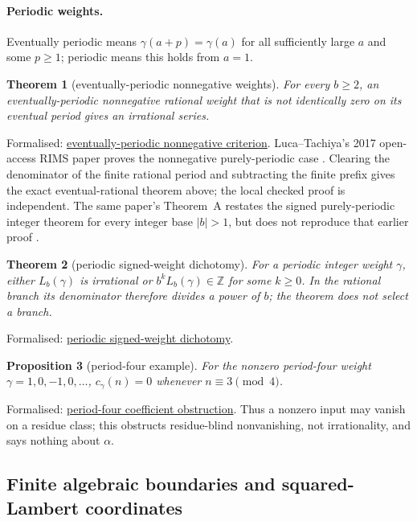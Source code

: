 \documentclass[11pt]{article}
\newcommand{\commit}{bb4e24651b37cd096d3749ef299c3317930b3a3b}
\newcommand{\repobase}{https://github.com/wcook04/plectis-lean-erdos249-257/blob/\commit}
\newcommand{\PK}{Erdos249257}
\newcommand{\lword}[4]{\href{\repobase/\PK/#1\#L#2}{#4}}
\newtheorem{theorem}{Theorem}[section]
\newtheorem{proposition}[theorem]{Proposition}
\theoremstyle{definition}
\theoremstyle{remark}
\newcommand{\Z}{\mathbb{Z}}
\begin{document}
{\paragraph{Periodic weights.}\label{sec:periodicweights}
Eventually periodic means $\gamma(a+p)=\gamma(a)$ for all sufficiently large
$a$ and some $p\geq1$; periodic means this holds from $a=1$.
\begin{theorem}[eventually-periodic nonnegative weights]
\label{res:periodicnonnegative}
For every $b\ge2$, an eventually-periodic nonnegative rational weight that is
not identically zero on its eventual period gives an irrational series.
\end{theorem}
\noindent Formalised:
\lword{CertificateKernel.lean}{12811}{irrational_ratWeightSeries_eventuallyPeriodic}{eventually-periodic nonnegative criterion}.
Luca--Tachiya's 2017 open-access RIMS paper proves the nonnegative
purely-periodic case \cite[Theorem~1, p.~139; proof
pp.~149--150]{lucatachiya2017}.  Clearing the denominator of the finite
rational period and subtracting the finite prefix gives the exact
eventual-rational theorem above; the local checked proof is independent.  The
same paper's Theorem~A restates the signed purely-periodic integer theorem for
every integer base $|b|>1$, but does not reproduce that earlier proof
\cite[Theorem~A, p.~139]{lucatachiya2017}.
\begin{theorem}[periodic signed-weight dichotomy]\label{res:periodicsigned}
For a periodic integer weight \(\gamma\), either \(L_b(\gamma)\) is irrational
or \(b^kL_b(\gamma)\in\Z\) for some \(k\ge0\).  In the rational branch its
denominator therefore divides a power of \(b\); the theorem does not select a branch.
\end{theorem}
\noindent Formalised:
\lword{CertificateKernel.lean}{14175}{irrational_or_bpow_mul_eq_intCast_intWeightedErdosSeries_periodic}{periodic signed-weight dichotomy}.
\begin{proposition}[period-four example]\label{res:periodfourobstruction}
For the nonzero period-four weight \(\gamma=1,0,-1,0,\ldots\),
$c_\gamma(n)=0$ whenever \(n\equiv3\pmod4\).
\end{proposition}
\noindent Formalised:
\lword{CertificateKernel.lean}{14226}{intWeightedCoeff_periodFourSignWeight_eq_zero_of_mod_four_eq_three}{period-four coefficient obstruction}.
Thus a nonzero input may vanish on a residue class; this obstructs residue-blind
nonvanishing, not irrationality, and says nothing about $\alpha$.

\subsection{Finite algebraic boundaries and squared-Lambert coordinates}
\label{app:lambert-algebraic}

}
\end{document}
